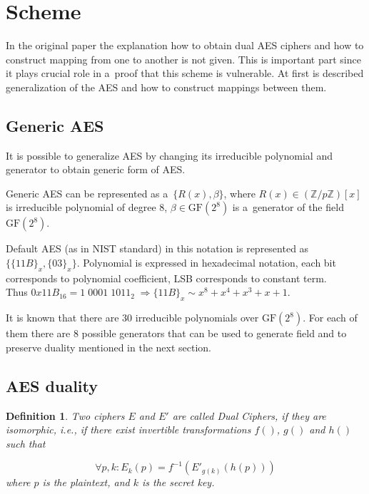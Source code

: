 \documentclass[11pt,oneside,final]{fithesis2}
\newtheorem{mydef}{Definition}
\newcommand{\gfe}{\ensuremath{\text{GF}\left(2^8\right)}}
\begin{document}
    
    \section{Scheme}

    In the original paper \citep{Karroumi:2010:PWA:2041036.2041060} the explanation how to obtain dual AES ciphers and how to construct mapping from one 
    to another is not given. This is
    important part since it plays crucial role in a~proof that this scheme is vulnerable. At first is described generalization of the AES and how to construct
    mappings between them. 

	\subsection{Generic AES}
	It is possible to generalize AES by changing its irreducible polynomial and generator to obtain generic form of AES.

	Generic AES can be represented as a~$\{R(x), \beta \}$, where $R(x) \in \left(\mathbb{Z}/p\mathbb{Z}\right)[x]$ is 
	irreducible polynomial of degree 8, $\beta \in \gfe$ is a~generator of the field $\gfe$.

	Default AES (as in NIST standard) in this notation is represented as $\{\{11B\}_x, \{03\}_x\}$. Polynomial is expressed
	in hexadecimal notation, each bit corresponds to polynomial coefficient, LSB corresponds to constant term.\\
	Thus $0x11B_{16} = 1 \; 0001 \; 1011_{2} \; \Rightarrow \{11B\}_x \sim x^8+x^4+x^3+x+1$.

	It is known that there are $30$ irreducible polynomials over $\gfe$. For each of them there are $8$ possible
	generators that can be used to generate field and to preserve duality mentioned in the next section.

	\subsection{AES duality}

	\begin{mydef}\label{def:dual_cipher}
	Two ciphers $E$ and $E'$ are called Dual Ciphers, if they are
	isomorphic, i.e., if there exist invertible transformations $f()$, $g()$ and $h()$ such
	that

	\begin{equation} 
	\forall p, k: E_k(p) = f^{-1}\left(E'_{g(k)}(h(p))\right)
	\end{equation}
	where $p$ is the plaintext, and $k$ is the secret key.
	\end{mydef}
\end{document}
